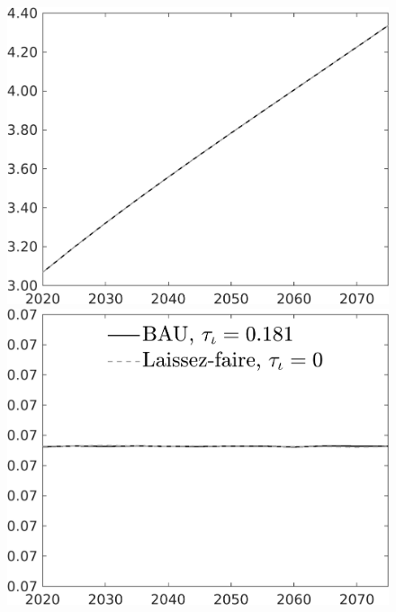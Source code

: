 \begin{figure}[h!!]
\begin{minipage}[]{0.32\textwidth}
\end{minipage}	
\begin{minipage}[]{0.32\textwidth}
\includegraphics[width=1\textwidth]{../../codding_model/own_basedOnFried/optimalPol_010922_revision/figures/all_13Sept22/CompTaul_Equlab_LFBAU_Reg0_wh_spillover0_nsk1_xgr1_knspil1_sep1_countec0_GovRev0_etaa0.79_lgd0.png}
\end{minipage}	
	\begin{minipage}[]{0.32\textwidth}
		\includegraphics[width=1\textwidth]{../../codding_model/own_basedOnFried/optimalPol_010922_revision/figures/all_13Sept22/CompTaul_Equlab_LFBAU_Reg0_GFF_spillover0_nsk1_xgr1_knspil1_sep1_countec0_GovRev0_etaa0.79_lgd1.png}

\end{minipage}
\end{figure}
